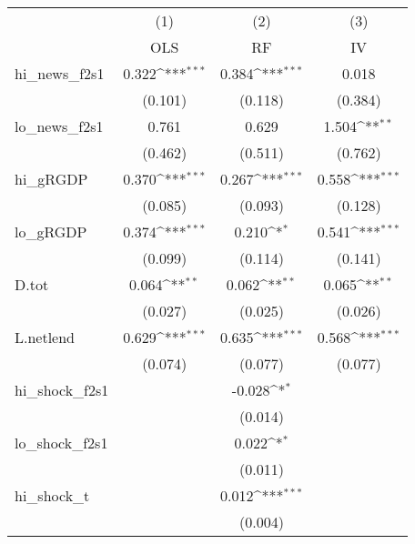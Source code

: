 {
\def\sym#1{\ifmmode^{#1}\else\(^{#1}\)\fi}
\begin{tabular}{l*{3}{c}}
\toprule
            &\multicolumn{1}{c}{(1)}&\multicolumn{1}{c}{(2)}&\multicolumn{1}{c}{(3)}\\
            &\multicolumn{1}{c}{OLS}&\multicolumn{1}{c}{RF}&\multicolumn{1}{c}{IV}\\
\midrule
hi\_news\_f2s1&       0.322\sym{***}&       0.384\sym{***}&       0.018         \\
            &     (0.101)         &     (0.118)         &     (0.384)         \\
\addlinespace
lo\_news\_f2s1&       0.761         &       0.629         &       1.504\sym{**} \\
            &     (0.462)         &     (0.511)         &     (0.762)         \\
\addlinespace
hi\_gRGDP    &       0.370\sym{***}&       0.267\sym{***}&       0.558\sym{***}\\
            &     (0.085)         &     (0.093)         &     (0.128)         \\
\addlinespace
lo\_gRGDP    &       0.374\sym{***}&       0.210\sym{*}  &       0.541\sym{***}\\
            &     (0.099)         &     (0.114)         &     (0.141)         \\
\addlinespace
D.tot       &       0.064\sym{**} &       0.062\sym{**} &       0.065\sym{**} \\
            &     (0.027)         &     (0.025)         &     (0.026)         \\
\addlinespace
L.netlend   &       0.629\sym{***}&       0.635\sym{***}&       0.568\sym{***}\\
            &     (0.074)         &     (0.077)         &     (0.077)         \\
\addlinespace
hi\_shock\_f2s1&                     &      -0.028\sym{*}  &                     \\
            &                     &     (0.014)         &                     \\
\addlinespace
lo\_shock\_f2s1&                     &       0.022\sym{*}  &                     \\
            &                     &     (0.011)         &                     \\
\addlinespace
hi\_shock\_t  &                     &       0.012\sym{***}&                     \\
            &                     &     (0.004)         &                     \\

\end{tabular}}
